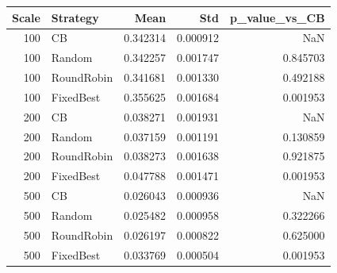 \begin{tabular}{rlrrr}
\toprule
Scale & Strategy & Mean & Std & p_value_vs_CB \\
\midrule
100 & CB & 0.342314 & 0.000912 & NaN \\
100 & Random & 0.342257 & 0.001747 & 0.845703 \\
100 & RoundRobin & 0.341681 & 0.001330 & 0.492188 \\
100 & FixedBest & 0.355625 & 0.001684 & 0.001953 \\
200 & CB & 0.038271 & 0.001931 & NaN \\
200 & Random & 0.037159 & 0.001191 & 0.130859 \\
200 & RoundRobin & 0.038273 & 0.001638 & 0.921875 \\
200 & FixedBest & 0.047788 & 0.001471 & 0.001953 \\
500 & CB & 0.026043 & 0.000936 & NaN \\
500 & Random & 0.025482 & 0.000958 & 0.322266 \\
500 & RoundRobin & 0.026197 & 0.000822 & 0.625000 \\
500 & FixedBest & 0.033769 & 0.000504 & 0.001953 \\
\bottomrule
\end{tabular}
